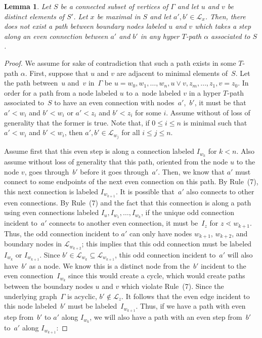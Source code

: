 \documentclass[pdftex]{sigma}
\numberwithin{equation}{section}
\newtheorem{Lemma}[Theorem]{Lemma}
\begin{document}
\begin{Lemma}\label{lem:NoExtendedVertexEvenStep}
Let $S$ be a connected subset of vertices of $\Gamma$ and let $u$ and $v$ be distinct elements of $S'$. Let $x$ be maximal in $S$ and let $a', b' \in \mathcal{L}_x$. Then, there does not exist a path between boundary nodes labeled $u$ and $v$ which takes a step along an even connection between $a'$ and $b'$ in any hyper $T$-path $\alpha$ associated to $S$.
\end{Lemma}

\begin{proof}
We assume for sake of contradiction that such a path exists in some $T$-path $\alpha$. First, suppose that $u$ and $v$ are adjacent to minimal elements of~$S$. Let the path between~$u$ and~$v$ in~$\Gamma$ be $u = w_0, w_1,\ldots,w_n,u \vee v, z_m,\ldots,z_1,v = z_0$. In order for a path from a node labeled $u$ to a~node labeled $v$ in a hyper $T$-path associated to~$S$ to have an even connection with nodes~$a'$,~$b'$, it must be that $a' < w_i$ and $b' < w_i$ or $a' < z_i$ and $b' < z_i$ for some $i$. Assume without of loss of generality that the former is true. Note that, if $0 \leq i \leq n$ is minimal such that $a' < w_i$ and $b' < w_i$, then $a',b' \in \mathcal{L}_{w_j}$ for all $i \leq j \leq n$.

Assume first that this even step is along a connection labeled $I_{w_k}$ for $k < n$. Also assume without loss of generality that this path, oriented from the node $u$ to the node $v$, goes through~$b'$ before it goes through~$a'$. Then, we know that $a'$ must connect to some endpoints of the next even connection on this path. By Rule~(7), this next connection is labeled $I_{w_{k+1}}$. It is possible that~$a'$ also connects to other even connections. By Rule~(7) and the fact that this connection is along a path using even connections labeled $I_u, I_{w_1},\ldots,I_{w_k}$, if the unique odd connection incident to~$a'$ connects to another even connection, it must be~$I_z$ for $z \lessdot w_{k+1}$. Thus, the odd connection incident to $a'$ can only have nodes $w_{k+1}$, $w_{k+2}$, and boundary nodes in $\mathcal{L}_{w_{k+2}}$; this implies that this odd connection must be labeled $I_{w_k}$ or $I_{w_{k+1}}$. Since $b' \in \mathcal{L}_{w_k} \subseteq \mathcal{L}_{w_{k+1}}$, this odd connection incident to~$a'$ will also have~$b'$ as a node. We know this is a distinct node from the~$b'$ incident to the even connection~$I_{w_k}$ since this would create a cycle, which would create paths between the boundary nodes $u$ and $v$ which violate Rule~(7). Since the underlying graph~$\Gamma$ is acyclic, $b' \notin \mathcal{L}_{z}$. It follows that the even edge incident to this node labeled~$b'$ must be labeled~$I_{w_{k+1}}$. Thus, if we have a path with even step from~$b'$ to $a'$ along $I_{w_k}$, we will also have a path with an even step from~$b'$ to~$a'$ along $I_{w_{k+1}}$:


\end{proof}
\end{document}
